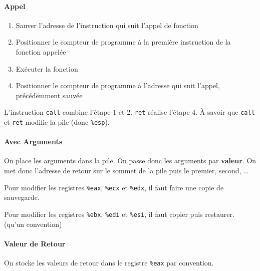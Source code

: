 \paragraph{Appel}\label{appel}

\begin{enumerate}
\def\labelenumi{\arabic{enumi}.}
\tightlist
\item
  Sauver l'adresse de l'instruction qui suit l'appel de fonction
\item
  Positionner le compteur de programme à la première instruction de la
  fonction appelée
\item
  Exécuter la fonction
\item
  Positionner le compteur de programme à l'adresse qui suit l'appel,
  précédemment sauvée
\end{enumerate}

L'instruction \texttt{call} combine l'étape 1 et 2. \texttt{ret} réalise
l'étape 4. À savoir que \texttt{call} et \texttt{ret} modifie la pile
(donc \texttt{\%esp}).

\begin{Shaded}
\begin{Highlighting}[]
\end{Highlighting}
\end{Shaded}

\paragraph{Avec Arguments}\label{avec-arguments}

On place les arguments dans la pile. On passe donc les arguments par
\textbf{valeur}. On met donc l'adresse de retour sur le sommet de la
pile puis le premier, second, \ldots{}

Pour modifier les registres \texttt{\%eax}, \texttt{\%ecx} et
\texttt{\%edx}, il faut faire une copie de sauvegarde.

Pour modifier les registres \texttt{\%ebx}, \texttt{\%edi} et
\texttt{\%esi}, il faut copier puis restaurer. (qu'un convention)

\paragraph{Valeur de Retour}\label{valeur-de-retour}

On stocke les valeurs de retour dans le registre \texttt{\%eax} par
convention.
